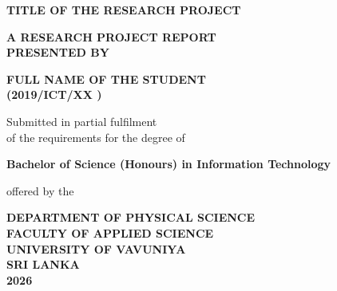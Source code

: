 \vspace*{\fill}
\begin{center}
\onehalfspacing
\MakeUppercase{\textbf{\large Title of the Research Project}}

\vspace{1.5in}

\MakeUppercase{\textbf{A Research Project Report\\Presented by}}

\vspace{0.6in}

\MakeUppercase{\textbf{Full Name of the Student\\(2019/ICT/xx )}}

\vspace{1.5in}

Submitted in partial fulfilment\\
of the requirements for the degree of

\vspace{0.6in}

\textbf{Bachelor of Science (Honours) in Information Technology}

\vspace{0.5in}

offered by the

\vspace{1.05in}

\textbf{DEPARTMENT OF PHYSICAL SCIENCE\\
FACULTY OF APPLIED SCIENCE\\
UNIVERSITY OF VAVUNIYA\\
SRI LANKA\\
2026
}
\end{center}